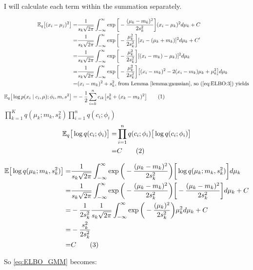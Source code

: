 \documentclass[]{article}
\newcommand{\Expectation} {\mathbb{E}}
\newcommand\numberthis    {\addtocounter{equation}{1}\tag{\theequation}}
\begin{document}
I will calculate each term within the summation separately.  

\begin{align*}
	\Expectation_q\big[(x_i-\mu_j)^2\big]
	=&\frac{1}{s_k\sqrt{2\pi}}  \int_{-\infty}^{\infty} \exp{\bigg[-\frac{(\mu_k-m_k)^2}{2 s_k^2}\bigg]}(x_i-\mu_k)^2 d \mu_k + C\\
	=&\frac{1}{s_k\sqrt{2\pi}}  \int_{-\infty}^{\infty} \exp{\bigg[-\frac{\mu_k^2}{2 s_k^2}\bigg]}[x_i-(\mu_k+m_k)]^2 d \mu_k + C^\prime \\
	=&\frac{1}{s_k\sqrt{2\pi}}  \int_{-\infty}^{\infty} \exp{\bigg[-\frac{\mu_k^2}{2 s_k^2}\bigg]}[(x_i-m_k)-\mu_k)]^2 d \mu_k\\
	=&\frac{1}{s_k\sqrt{2\pi}}  \int_{-\infty}^{\infty} \exp{\bigg[-\frac{\mu_k^2}{2 s_k^2}\bigg]}\big[(x_i-m_k)^2-2(x_i-m_k)\mu_k+\mu_k^2\big] d \mu_k\\
	=& (x_i-m_k)^2 + s_k^2 \text{, from Lemma \ref{lemma:gaussian}, so  (\ref{eq:ELBO:3}) yields}\\
	\Expectation_q\big[\log{p(x_i\mid c_i,\mu);\phi_i,m,s^2}\big] =&  -\frac{1}{2} \sum_{i=k}^{n} c_{ik} \big[s_k^2 + (x_k-m_k)^2 \big] \numberthis \label{eq:ELBO:3F}
\end{align*}
$\prod_{k=1}^{K} q(\mu_k;m_k,s_k^2) \prod_{i=1}^{n}q(c_i;\phi_i)$
\begin{align*}
	\Expectation_q\big[\log{q(c_i;\phi_i)}\big] =& \prod_{i=1}^{n}q(c_i;\phi_i) \big[\log{q(c_i;\phi_i)}\big]\\
	=& C \numberthis \label{eq:ELBO:4}
\end{align*}

\begin{align*} 
 	\Expectation \big[\log{q(\mu_k;m_k,s^2_k)}\big] =& \frac{1}{s_k\sqrt{2\pi}} \int_{-\infty}^{\infty} \exp{\bigg(- \frac{(\mu_k-m_k)^2}{2 s_k^2}\bigg)} \bigg[\log{q(\mu_k;m_k,s^2_k)} \bigg] d\mu_k \\
 	 =& \frac{1}{s_k\sqrt{2\pi}} \int_{-\infty}^{\infty} \exp{\bigg(- \frac{(\mu_k-m_k)^2}{2 s_k^2}\bigg)} \bigg[- \frac{(\mu_k-m_k)^2}{2 s_k^2}\bigg] d\mu_k + C\\
 	  =& - \frac{1 }{2 s_k^2} \frac{1}{ s_k\sqrt{2\pi}} \int_{-\infty}^{\infty} \exp{\bigg(- \frac{(\mu_k)^2}{2 s_k^2}\bigg)} \mu_k^2 d\mu_k + C\\
 	=& - \frac{s_k^2 }{2 s_k^2} \\
 	=& C \numberthis \label{eq:ELBO:5}
\end{align*}

So \eqref{eq:ELBO_GMM} becomes: 
\end{document}
